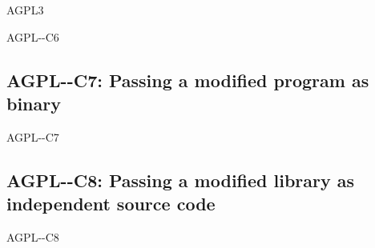\begin{license}{AGPL3}
\begin{lsuc}{AGPL-\ver-C6}
  \useCaseSix

  \begin{lsucrequires}
    \lsucmandatory{\keepLicenseElements}
    \lsucmandatory{\gplthreeEnsureCopyrightNoticeSource}
    \lsucmandatory{\giveLicense}\passingFilesCorrectly
    \lsucmandatory{\retainCopyrightNotices}
    \lsucmandatory{\addToCopyrightDialogApp}
    \lsucmandatory{\markProgramModifications}
    \lsucmandatory{\arrangeProgramChanges}\howToApplyTheseTerms
    \lsucoptional{\createChangelog}
    \lsucoptional{\addToDocumentation}
  \end{lsucrequires}

  \begin{lsucprohibits}
    \lsucitem{\noPatentLitigation}
  \end{lsucprohibits}
\end{lsuc}

\subsection{AGPL-\ver-C7: Passing a modified program as binary}
\begin{lsuc}{AGPL-\ver-C7}

  \useCaseSeven

  \begin{lsucrequires}
    \lsucmandatory{\keepLicenseElements}
    \lsucmandatory{\gplthreeEnsureCopyrightNoticeBinary}
    \lsucmandatory{\giveLicense}\passingFilesCorrectly
    \lsucmandatory{\retainCopyrightNotices}
    \lsucmandatory{\markProgramModifications}
    \lsucmandatory{\addToCopyrightDialogApp}
    \lsucmandatory{\arrangeProgramChanges}\howToApplyTheseTerms
    \lsucmandatory{\makeModifiedSourceAvailable}
    \lsucmandatory{\describeHowToGetSource}
    \lsucoptional{\createChangelog}
    \lsucoptional{\addToDocumentation}
  \end{lsucrequires}

  \begin{lsucprohibits}
    \lsucitem{\noPatentLitigation}
  \end{lsucprohibits}
\end{lsuc}

\subsection{AGPL-\ver-C8: Passing a modified library as independent source code}
\begin{lsuc}{AGPL-\ver-C8}


\end{lsuc}
\end{license}
